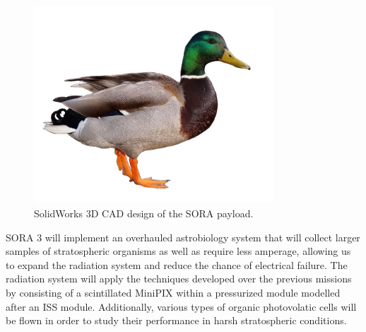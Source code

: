 \label{sec:Hardware}

\begin{figure}[!ht]
\begin{center}
\includegraphics[width=0.8\textwidth]{./Figures/duck.jpg}
\caption{SolidWorks 3D CAD design of the SORA payload.}
\label{fig:payload} 
\end{center}
\end{figure}

SORA 3 will implement an overhauled astrobiology system that will collect larger samples of stratospheric organisms as well as require less amperage, allowing us to expand the radiation system and reduce the chance of electrical failure. The radiation system will apply the techniques developed over the previous missions by consisting of a scintillated MiniPIX within a pressurized module modelled after an ISS module. Additionally, various types of organic photovolatic cells will be flown in order to study their performance in harsh stratospheric conditions.
